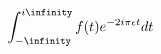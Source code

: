 \documentclass[preview]{standalone}
\begin{document}
\begin{align*}
\int^{i \infinity}_{- \infinity} f(t) e^{-2 i \pi \epsilon t}dt
\end{align*}
\end{document}
